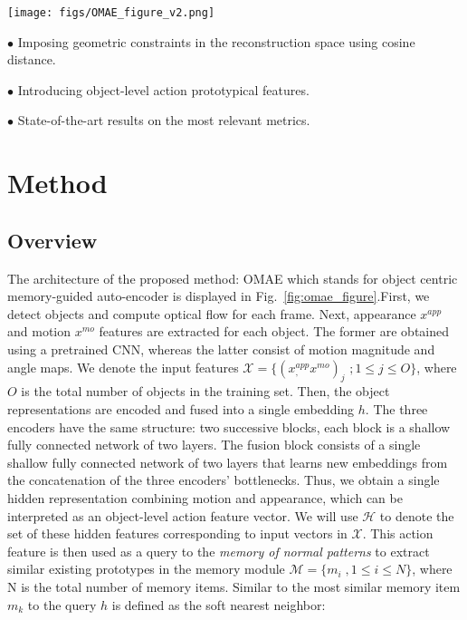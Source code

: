 \documentclass{article}
\begin{document}
\begin{figure*}
	\centering
	\texttt{[image: figs/OMAE\_figure\_v2.png]}
	\caption{ Overview of OMAE. At the preprocessing step, object bounding boxes and Optical Flow (OF) are computed. Object appearance features, extracted using a pretrained CNN, motion magnitude and angle maps are fed to the corresponding autoencoders. The encoded representations are fused ($h$) and sent as a query to the memory module which fetches similar memory items. Their linear combination concatenated with $h$ is sent to the decoder to obtain object appearance and motion reconstructions. The anomaly score is defined based on the dissimilarity between the input features and their reconstructions as well the dissimilarity between the query $h$ and its neighbors.}
	\label{fig:omae_figure}
\end{figure*}

 $\bullet$ Imposing geometric constraints in the reconstruction space using cosine distance.
 
 $\bullet$ Introducing object-level action prototypical features.

  $\bullet$ State-of-the-art results on the most relevant metrics.

\section{Method}
\label{sec:method}
\subsection{Overview}

The architecture of the proposed method: OMAE which stands for object centric memory-guided auto-encoder is displayed in Fig.~\ref{fig:omae_figure}.First, we detect objects and compute optical flow for each frame. Next, appearance $x^{app}$ and motion $x^{mo}$ features are extracted for each object. The former are obtained using a pretrained CNN, whereas the latter consist of motion magnitude and angle maps. We denote the input features $\mathcal{X} = \{ (x^{app}_,x^{mo} )_{j}$ \; $; 1\leq j\leq O\}$,  where $O$ is the total number of objects in the training set. Then, the object representations are encoded and fused into a single embedding $h$.
The three encoders have the same structure: two successive blocks, each block is a shallow fully connected network of two layers. The fusion block consists of a single shallow fully connected network of two layers that learns new embeddings from the concatenation of the three encoders' bottlenecks. 
Thus, we obtain a single hidden representation combining motion and appearance, which can be interpreted as an object-level action feature vector. We will use $\mathcal{H}$ to denote the set of these hidden features corresponding to input vectors in $\mathcal{X}$. This action feature is then used as a query to the \emph{memory of normal patterns} to extract similar existing prototypes in the memory module $\mathcal{M} = \{m_{i} \; ,1\leq i\leq N\}$,  where N is the total number of memory items. 
Similar to \cite{mnad} the most similar memory item $m_{k}$ to the query $h$ is defined as the soft nearest neighbor:
\end{document}
